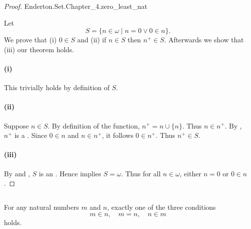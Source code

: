 \documentclass{report}
\begin{document}
\begin{proof}

    {Enderton.Set.Chapter\_4.zero\_least\_nat}

  Let $$S = \{n \in \omega \mid n = 0 \lor 0 \in n\}.$$
  We prove that (i) $0 \in S$ and (ii) if $n \in S$ then $n^+ \in S$.
  Afterwards we show that (iii) our theorem holds.

  \paragraph{(i)}%

    This trivially holds by definition of $S$.

  \paragraph{(ii)}%

    Suppose $n \in S$.
    By definition of the  function, $n^+ = n \cup \{n\}$.
    Thus $n \in n^+$.
    By , $n^+$ is a .
    Since $0 \in n$ and $n \in n^+$, it follows $0 \in n^+$.
    Thus $n^+ \in S$.

  \paragraph{(iii)}%

    By  and
      , $S$ is an
      .
    Hence  implies $S = \omega$.
    Thus for all $n \in \omega$, either $n = 0$ or $0 \in n$.

\end{proof}

\subsection{}%

\begin{theorem}

  For any natural numbers $m$ and $n$, exactly one of the three conditions
    $$m \in n, \quad m = n, \quad n \in m$$ holds.

\end{theorem}
\end{document}
